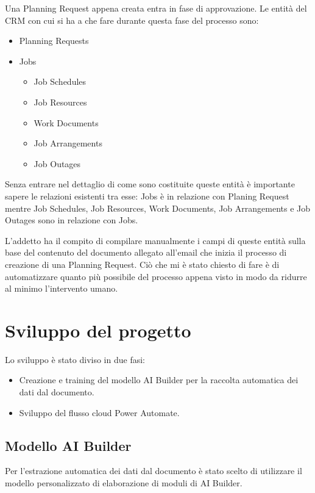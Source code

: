 Una Planning Request appena creata entra in fase di approvazione. Le entità del CRM con cui si ha a che fare durante questa fase del processo sono: 
\begin{itemize}
  \item Planning Requests
  \item Jobs \begin{itemize}
    \item Job Schedules 
    \item Job Resources
    \item Work Documents
    \item Job Arrangements
    \item Job Outages
  \end{itemize}
\end{itemize}

Senza entrare nel dettaglio di come sono costituite queste entità è importante sapere le relazioni esistenti tra esse: Jobs è in relazione con Planing Request mentre Job Schedules, Job Resources, Work Documents, Job Arrangements e Job Outages sono in relazione con Jobs. 

L'addetto ha il compito di compilare manualmente i campi di queste entità sulla base del contenuto del documento allegato all'email che inizia il processo di creazione di una Planning Request. 
Ciò che mi è stato chiesto di fare è di automatizzare quanto più possibile del processo appena visto in modo da ridurre al minimo l'intervento umano.

\section{Sviluppo del progetto}
Lo sviluppo è stato diviso in due fasi: 
\begin{itemize}
  \item Creazione e training del modello AI Builder per la raccolta automatica dei dati dal documento.
  \item Sviluppo del flusso cloud Power Automate.
\end{itemize}
  
\subsection{Modello AI Builder}
Per l'estrazione automatica dei dati dal documento è stato scelto di utilizzare il modello personalizzato di elaborazione di moduli di AI Builder. 

